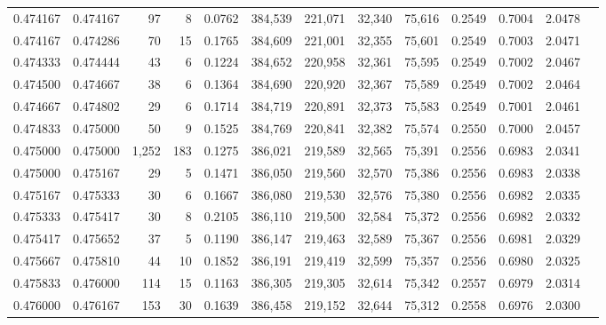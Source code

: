 \begin{tabular}{rrrrrrrrrrrrr}
0.474167 & 0.474167 &    97 &   8 &                                     0.0762 & 384,539 & 221,071 &  32,340 &  75,616 & 0.2549 & 0.7004 & 2.0478 \\
0.474167 & 0.474286 &    70 &  15 &                                     0.1765 & 384,609 & 221,001 &  32,355 &  75,601 & 0.2549 & 0.7003 & 2.0471 \\
0.474333 & 0.474444 &    43 &   6 &                                     0.1224 & 384,652 & 220,958 &  32,361 &  75,595 & 0.2549 & 0.7002 & 2.0467 \\
0.474500 & 0.474667 &    38 &   6 &                                     0.1364 & 384,690 & 220,920 &  32,367 &  75,589 & 0.2549 & 0.7002 & 2.0464 \\
0.474667 & 0.474802 &    29 &   6 &                                     0.1714 & 384,719 & 220,891 &  32,373 &  75,583 & 0.2549 & 0.7001 & 2.0461 \\
0.474833 & 0.475000 &    50 &   9 &                                     0.1525 & 384,769 & 220,841 &  32,382 &  75,574 & 0.2550 & 0.7000 & 2.0457 \\
0.475000 & 0.475000 & 1,252 & 183 &                                     0.1275 & 386,021 & 219,589 &  32,565 &  75,391 & 0.2556 & 0.6983 & 2.0341 \\
0.475000 & 0.475167 &    29 &   5 &                                     0.1471 & 386,050 & 219,560 &  32,570 &  75,386 & 0.2556 & 0.6983 & 2.0338 \\
0.475167 & 0.475333 &    30 &   6 &                                     0.1667 & 386,080 & 219,530 &  32,576 &  75,380 & 0.2556 & 0.6982 & 2.0335 \\
0.475333 & 0.475417 &    30 &   8 &                                     0.2105 & 386,110 & 219,500 &  32,584 &  75,372 & 0.2556 & 0.6982 & 2.0332 \\
0.475417 & 0.475652 &    37 &   5 &                                     0.1190 & 386,147 & 219,463 &  32,589 &  75,367 & 0.2556 & 0.6981 & 2.0329 \\
0.475667 & 0.475810 &    44 &  10 &                                     0.1852 & 386,191 & 219,419 &  32,599 &  75,357 & 0.2556 & 0.6980 & 2.0325 \\
0.475833 & 0.476000 &   114 &  15 &                                     0.1163 & 386,305 & 219,305 &  32,614 &  75,342 & 0.2557 & 0.6979 & 2.0314 \\
0.476000 & 0.476167 &   153 &  30 &                                     0.1639 & 386,458 & 219,152 &  32,644 &  75,312 & 0.2558 & 0.6976 & 2.0300 \\

\end{tabular}
